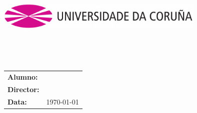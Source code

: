 %
%
\begin{titlepage}
	\begin{center}
		\includegraphics[width=10cm]{./images/03-simbolo-logo-cor-udc-2.png}
		\vspace{2cm}

		{\Large{\textbf{\centro}}}
		\\
		{\it \large{\textbf{\departamento}}}
		\vspace{1cm}

		{\large {\sc \proyecto}\\{\curso}}
		\vspace{1cm}

		\textbf{\Large \titulogalego}
		\vspace{6cm}
	\end{center}

	\begin{flushright}
		\begin{tabular}{ll}
			\large{\textbf{Alumno:}}	&
			\large{\autor} \\

			\large{\textbf{Director:}}	&
			\large{\director} \\


			\large{\textbf{Data:}}		&
			\large{\today} \\
		\end{tabular}
	\end{flushright}
\end{titlepage}
